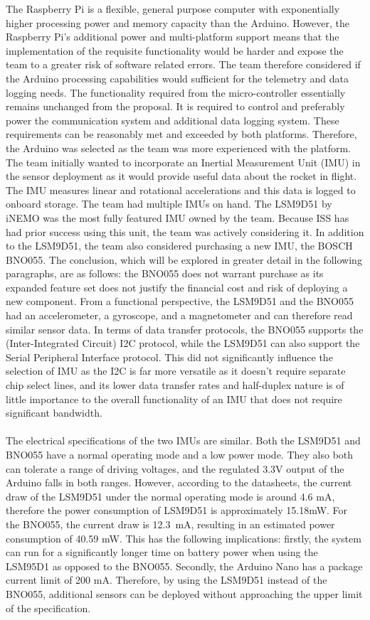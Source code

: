 The Raspberry Pi is a flexible, general purpose computer with exponentially higher processing power and memory capacity than the Arduino. However, the Raspberry Pi’s additional power and multi-platform support means that the implementation of the requisite functionality would be harder and expose the team to a greater risk of software related errors. The team therefore considered if the Arduino processing capabilities would sufficient for the telemetry and data logging needs. 
	The functionality required from the micro-controller essentially remains unchanged from the proposal. It is required to control and preferably power the communication system and additional data logging system. These requirements can be reasonably met and exceeded by both platforms. Therefore, the Arduino was selected as the team was more experienced with the platform. 
The team initially wanted to incorporate an Inertial Measurement Unit (IMU) in the sensor deployment as it would provide useful data about the rocket in flight. The IMU measures linear and rotational accelerations and this data is logged to onboard storage. The team had multiple IMUs on hand. The LSM9D51 by iNEMO was the most fully featured IMU owned by the team. Because ISS has had prior success using this unit, the team was actively considering it. In addition to the LSM9D51, the team also considered purchasing a new IMU, the BOSCH BNO055. The conclusion, which will be explored in greater detail in the following paragraphs, are as follows: the BNO055 does not warrant purchase as its expanded feature set does not justify the financial cost and risk of deploying a new component.  
From a functional perspective, the LSM9D51 and the BNO055 had an accelerometer, a gyroscope, and a magnetometer and can therefore read similar sensor data. In terms of data transfer protocols, the BNO055 supports the (Inter-Integrated Circuit) I2C protocol, while the LSM9D51 can also support the Serial Peripheral Interface protocol. This did not significantly influence the selection of IMU as the I2C is far more versatile as it doesn’t require separate chip select lines, and its lower data transfer rates and half-duplex nature is of little importance to the overall functionality of an IMU that does not require significant bandwidth.\\\\
The electrical specifications of the two IMUs are similar. Both the LSM9D51 and BNO055 have a normal operating mode and a low power mode. They also both can tolerate a range of driving voltages, and the regulated 3.3V output of the Arduino falls in both ranges. However, according to the datasheets, the current draw of the LSM9D51 under the normal operating mode is around 4.6 mA, therefore the power consumption of LSM9D51 is approximately 15.18mW. For the BNO055, the current draw is \SI{12.3}{\milli\ampere}, resulting in an estimated power consumption of 40.59 mW. This has the following implications: firstly, the system can run for a significantly longer time on battery power when using the LSM95D1 as opposed to the BNO055. Secondly, the Arduino Nano has a package current limit of 200 mA. Therefore, by using the LSM9D51 instead of the BNO055, additional sensors can be deployed without approaching the upper limit of the specification. 	

